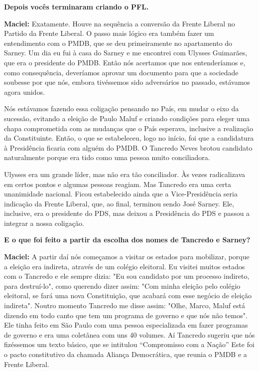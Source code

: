 \textbf{Depois vocês terminaram criando o PFL.}

\textbf{Maciel:} Exatamente. Houve na sequência a conversão da Frente
Liberal no Partido da Frente Liberal. O passo mais lógico era também
fazer um entendimento com o PMDB, que se deu primeiramente no
apartamento do Sarney. Um dia eu fui à casa do Sarney e me encontrei com
Ulysses Guimarães, que era o presidente do PMDB. Então nós acertamos que
nos entenderíamos e, como consequência, deveríamos aprovar um documento
para que a sociedade soubesse por que nós, embora tivéssemos sido
adversários no passado, estávamos agora unidos.

Nós estávamos fazendo essa coligação pensando no País, em mudar o eixo
da sucessão, evitando a eleição de Paulo Maluf e criando condições para
eleger uma chapa comprometida com as mudanças que o País esperava,
inclusive a realização da Constituinte. Então, o que se estabeleceu,
logo no início, foi que a candidatura à Presidência ficaria com alguém
do PMDB. O Tancredo Neves brotou candidato naturalmente porque era tido
como uma pessoa muito conciliadora.

Ulysses era um grande líder, mas não era tão conciliador. Às vezes
radicalizava em certos pontos e algumas pessoas reagiam. Mas Tancredo
era uma certa unanimidade nacional. Ficou estabelecido ainda que a
Vice-Presidência seria indicação da Frente Liberal, que, ao final,
terminou sendo José Sarney. Ele, inclusive, era o presidente do PDS, mas
deixou a Presidência do PDS e passou a integrar a nossa coligação.

\textbf{E o que foi feito a partir da escolha dos nomes de Tancredo e
Sarney? }

\textbf{Maciel:} A partir daí nós começamos a visitar os estados para
mobilizar, porque a eleição era indireta, através de um colégio
eleitoral. Eu visitei muitos estados com o Tancredo e ele sempre dizia:
"Eu sou candidato por um processo indireto, para destruí-lo", como
querendo dizer assim: "Com minha eleição pelo colégio eleitoral, se fará
uma nova Constituição, que acabará com esse negócio de eleição
indireta". Noutro momento Tancredo me disse assim: "Olhe, Marco, Maluf
está dizendo em todo canto que tem um programa de governo e que nós não
temos". Ele tinha feito em São Paulo com uma pessoa especializada em
fazer programas de governo e era uma coletânea com uns 40 volumes. Aí
Tancredo sugeriu que nós fizéssemos um texto básico, que se intitulou
``Compromisso com a Nação'' Este foi o pacto constitutivo da chamada
Aliança Democrática, que reunia o PMDB e a Frente Liberal.

